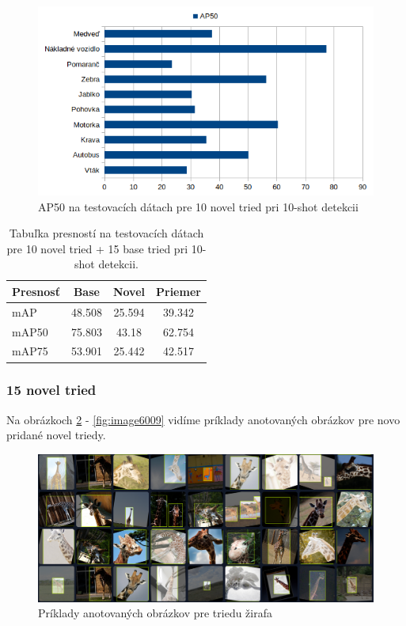 \begin{figure}[H]
\centering
\includegraphics[width=\textwidth]{images/10novel_classes_chart.png}
\caption{AP50 na testovacích dátach pre 10 novel tried pri 10-shot detekcii}
\label{fig:image611}
\end{figure}

\begin{table}[H]
\begin{tabular}{|l|c|c|c|}
\hline
\textbf{Presnosť} & \textbf{Base} & \textbf{Novel} & \textbf{Priemer} \\
\hline
mAP & 48.508 & 25.594 & 39.342 \\
mAP50 & 75.803 & 43.18 & 62.754 \\
mAP75 & 53.901 & 25.442 & 42.517 \\
\hline
\end{tabular}
\centering
\caption{Tabuľka presností na testovacích dátach pre 10 novel tried + 15 base tried pri 10-shot detekcii.}
\label{tab:table60}
\end{table}

\subsubsection{15 novel tried}

Na obrázkoch \ref{fig:image6005} - \ref{fig:image6009} vidíme príklady anotovaných obrázkov pre novo pridané novel triedy.

\begin{figure}[H]
\centering
\includegraphics[width=\textwidth]{images/giraffe_example_annotations.png}
\caption{Príklady anotovaných obrázkov pre triedu žirafa}
\label{fig:image6005}
\end{figure}

